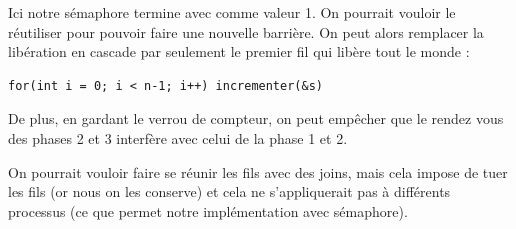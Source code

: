 \begin{rem}
	Ici notre sémaphore termine avec comme valeur 1. On pourrait vouloir le réutiliser pour pouvoir faire une nouvelle barrière. On peut alors remplacer la libération en cascade par seulement le premier fil qui libère tout le monde :
	
	\begin{lstlisting}
for(int i = 0; i < n-1; i++) incrementer(&s) 
	\end{lstlisting}
	
	De plus, en gardant le verrou de compteur, on peut empêcher que le rendez vous des phases 2 et 3 interfère avec celui de la phase 1 et 2.
\end{rem}

\begin{rem}
	On pourrait vouloir faire se réunir les fils avec des joins, mais cela impose de tuer les fils (or nous on les conserve) et cela ne s'appliquerait pas à différents processus (ce que permet notre implémentation avec sémaphore).
\end{rem}

